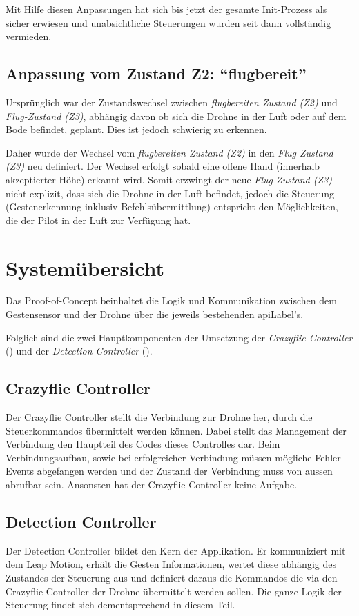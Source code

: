 Mit Hilfe diesen Anpassungen hat sich bis jetzt der gesamte Init-Prozess als sicher erwiesen und unabsichtliche Steuerungen wurden seit dann vollständig vermieden.

\subsection{Anpassung vom Zustand Z2: "`flugbereit"'}
Ursprünglich war der Zustandswechsel zwischen \textit{flugbereiten Zustand (Z2)} und \textit{Flug-Zustand (Z3)}, abhängig davon  ob sich die Drohne in der Luft oder auf dem Bode befindet, geplant.
Dies ist jedoch schwierig zu erkennen.

Daher wurde der Wechsel vom \textit{flugbereiten Zustand (Z2)} in den \textit{Flug Zustand (Z3)} neu definiert.
Der Wechsel erfolgt sobald eine offene Hand (innerhalb akzeptierter Höhe) erkannt wird.
Somit erzwingt der neue \textit{Flug Zustand (Z3)} nicht explizit, dass sich die Drohne in der Luft befindet, jedoch die Steuerung (Gestenerkennung inklusiv Befehlsübermittlung) entspricht den Möglichkeiten, die der Pilot in der Luft zur Verfügung hat.


\section{Systemübersicht}
Das Proof-of-Concept beinhaltet die Logik und Kommunikation zwischen dem Gestensensor und der Drohne über die jeweils bestehenden \gls{apiLabel}'s.

Folglich sind die zwei Hauptkomponenten der Umsetzung der \textit{Crazyflie Controller} () und der \textit{Detection Controller} ().

\subsection{Crazyflie Controller}
\label{sec:poc:controllerCrazyflie}
Der Crazyflie Controller stellt die Verbindung zur Drohne her, durch die Steuerkommandos übermittelt werden können.
Dabei stellt das Management der Verbindung den Hauptteil des Codes dieses Controlles dar.
Beim Verbindungsaufbau, sowie bei erfolgreicher Verbindung müssen mögliche Fehler-Events abgefangen werden und der Zustand der Verbindung muss von aussen abrufbar sein.
Ansonsten hat der Crazyflie Controller keine Aufgabe.

\subsection{Detection Controller}
\label{sec:poc:controllerDetection}
Der Detection Controller bildet den Kern der Applikation. Er kommuniziert mit dem Leap Motion, erhält die Gesten Informationen, wertet diese abhängig des Zustandes der Steuerung aus und definiert daraus die Kommandos die via den Crazyflie Controller der Drohne übermittelt werden sollen.
Die ganze Logik der Steuerung findet sich dementsprechend in diesem Teil.

